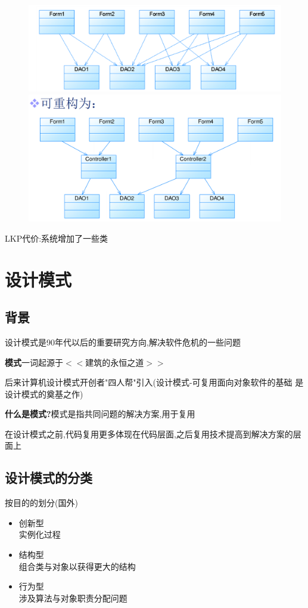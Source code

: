 \documentclass[UTF8,a4paper]{ctexart}
\begin{document}
\begin{figure}[H]
  \centering
  \includegraphics[scale = 0.3]{assets/SoftwareEngineering_b4f96.png}
  \includegraphics[scale = 0.3]{assets/SoftwareEngineering_5e4f3.png}
\end{figure}

LKP代价:系统增加了一些类

\section{设计模式}
\subsection{背景}
设计模式是90年代以后的重要研究方向,解决软件危机的一些问题

\textbf{模式}一词起源于$<<$建筑的永恒之道$>>$

后来计算机设计模式开创者"四人帮"引入(设计模式-可复用面向对象软件的基础 是设计模式的奠基之作)

\textbf{什么是模式?}模式是指共同问题的解决方案,用于复用

在设计模式之前,代码复用更多体现在代码层面,之后复用技术提高到解决方案的层面上

\subsection{设计模式的分类}
按目的的划分(国外)
\begin{itemize}
  \item 创新型\\
  实例化过程
  \item 结构型\\
  组合类与对象以获得更大的结构
  \item 行为型\\
  涉及算法与对象职责分配问题
\end{itemize}
\end{document}

